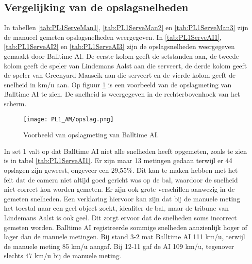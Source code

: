 \subsection{Vergelijking van de opslagsnelheden}
\label{sec:snelheden}

In tabellen \ref{tab:PL1ServeMan1}, \ref{tab:PL1ServeMan2} en \ref{tab:PL1ServeMan3} zijn de manueel gemeten opslagsnelheden weergegeven. In \ref{tab:PL1ServeAI1}, \ref{tab:PL1ServeAI2} en \ref{tab:PL1ServeAI3} zijn  de opslagsnelheden weergegeven gemaakt door Balltime AI. De eerste kolom geeft de setstanden aan, de tweede kolom geeft de speler van Lindemans Aalst aan die serveert, de derde kolom geeft de speler van Greenyard Maaseik aan die serveert en de vierde kolom geeft de snelheid in km/u aan. Op figuur \ref{fig:PL1_Serve} is een voorbeeld van de opslagmeting van Balltime AI te zien. De snelheid is weergegeven in de rechterbovenhoek van het scherm.

\begin{figure}
  \centering
  \texttt{[image: PL1\_AM/opslag.png]}
  \caption{\label{fig:PL1_Serve}Voorbeeld van opslagmeting van Balltime AI.}
\end{figure}

In set 1 valt op dat Balltime AI niet alle snelheden heeft opgemeten, zoals te zien is in tabel \ref{tab:PL1ServeAI1}. Er zijn maar 13 metingen gedaan terwijl er 44 opslagen zijn geweest, ongeveer een 29,55\%. Dit kan te maken hebben met het feit dat de camera niet altijd goed gericht was op de bal, waardoor de snelheid niet correct kon worden gemeten. Er zijn ook grote verschillen aanwezig in de gemeten snelheden. Een verklaring hiervoor kan zijn dat bij de manuele meting het toestal naar een geel object zoekt, idealiter de bal, maar de tribune van Lindemans Aalst is ook geel. Dit zorgt ervoor dat de snelheden soms incorrect gemeten worden. 
Balltime AI registreerde sommige snelheden aanzienlijk hoger of lager dan de manuele metingen. Bij stand 3-2 mat Balltime AI 111 km/u, terwijl de manuele meting 85 km/u aangaf. Bij 12-11 gaf de AI 109 km/u, tegenover slechts 47 km/u bij de manuele meting.

